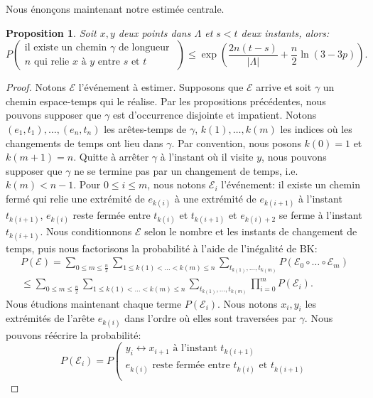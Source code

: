 \documentclass[titlepage,a4paper,12pt]{article}
\newcounter{d}
\newcounter{t}
\newcounter{p}
\newcounter{c}
\newcounter{a}
\newcounter{l}
\newtheorem{prop}[p]{Proposition}
\begin{document}
Nous énonçons maintenant notre estimée centrale.
\begin{prop} Soit 
$x,y$ deux points dans $\Lambda$ et $s<t$ deux instants, alors:
$$P\left(\begin{array}{c}
\text{il existe un chemin }\gamma \text{ de longueur }\\ n\text{ qui relie }x\text{ à }y \text{ entre }s\text{ et }t
\end{array}\right) \leqslant \exp\left(\frac{2n(t-s)}{|\Lambda|}+\frac{n}{2}\ln(3-3p)\right).$$
\end{prop}
\begin{proof}
Notons $\mathcal{E}$ l'événement à estimer. Supposons que $\mathcal{E}$ arrive et soit $\gamma$ un chemin espace-temps qui le réalise. Par les propositions précédentes, nous pouvons supposer que $\gamma$ est d'occurrence disjointe et impatient. Notons $(e_1,t_1),\dots,(e_n,t_n)$ les arêtes-temps de $\gamma$, $k(1),\dots,k(m)$ les indices où les changements de temps ont lieu dans $\gamma$. Par convention, nous posons $k(0) = 1$ et $k(m+1)=n$. Quitte à arrêter $\gamma$ à l'instant où il visite $y$, nous pouvons supposer que $\gamma$ ne se termine pas par un changement de temps, i.e. $k(m)< n-1$. Pour $0\leqslant i \leqslant m$, nous notons $\mathcal{E}_i$ l'événement: il existe un chemin fermé qui relie une extrémité de $e_{k(i)}$ à une extrémité de $e_{k(i+1)}$ à l'instant $t_{k(i+1)}$, $e_{k(i)}$ reste fermée entre $t_{k(i)}$ et $t_{k(i+1)}$ et $e_{k(i)+2}$ se ferme à l'instant $t_{k(i+1)}$. Nous conditionnons $\mathcal{E}$ selon le nombre et les instants de changement de temps, puis nous factorisons la probabilité à l'aide de l'inégalité de BK:
\begin{multline*}
P(\mathcal{E})
= \sum_{0\leqslant m \leqslant \frac{n}{2}}\sum_{1\leqslant k(1)<\dots<k(m)\leqslant n}\sum_{t_{k(1)},\dots,t_{k(m)}}P(\mathcal{E}_0\circ\dots\circ \mathcal{E}_m)\\
\leqslant \sum_{0\leqslant m \leqslant \frac{n}{2}}\sum_{1\leqslant k(1)<\dots<k(m)\leqslant n}\sum_{t_{k(1)},\dots,t_{k(m)}} \prod_{i=0}^mP(\mathcal{E}_i).
\end{multline*}
Nous étudions maintenant chaque terme $P(\mathcal{E}_i)$. Nous notons $x_i,y_i$ les extrémités de l'arête $e_{k(i)}$ dans l'ordre où elles sont traversées par $\gamma$. Nous pouvons réécrire la probabilité:
$$
P(\mathcal{E}_i) = P\left(\begin{array}{c}
y_i\longleftrightarrow x_{i+1}\text{ à l'instant }t_{k(i+1)}\\
e_{k(i)} \text{ reste fermée entre } t_{k(i)} \text{ et } t_{k(i+1)}\\

\end{array}$$
\end{proof}
\end{document}
